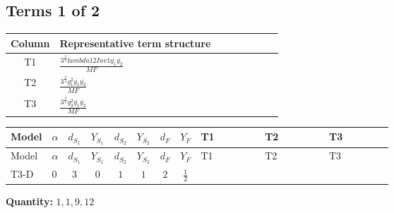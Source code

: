 \documentclass[8pt]{article}
\begin{document}
\begin{landscape}
\subsection*{Terms 1 of 2}
\begin{center}
\begin{tabular}{@{}c >{\raggedright\arraybackslash}p{0.82\linewidth}@{}}
\toprule
Column & Representative term structure \\
\midrule
T1 & \(\displaystyle \frac{3^{\frac{3}{4}} lambda12Inv1 \overline{y_{1}} \overline{y_{2}}}{MF}\) \\
\midrule
T2 & \(\displaystyle \frac{3^{\frac{3}{4}} g_{1}^{2} \overline{y_{1}} \overline{y_{2}}}{MF}\) \\
\midrule
T3 & \(\displaystyle \frac{3^{\frac{3}{4}} g_{2}^{2} \overline{y_{1}} \overline{y_{2}}}{MF}\) \\
\midrule
\bottomrule
\end{tabular}
\end{center}
\smallskip
\tiny
\begin{longtable}{@{}llcccccc >{\raggedright\arraybackslash}p{0.21\linewidth} >{\raggedright\arraybackslash}p{0.21\linewidth} >{\raggedright\arraybackslash}p{0.21\linewidth}@{}}
\toprule
Model & $\alpha$ & $d_{S_1}$ & $Y_{S_1}$ & $d_{S_2}$ & $Y_{S_2}$ & $d_F$ & $Y_F$ & T1 & T2 & T3 \\
\midrule
\endfirsthead
\toprule
Model & $\alpha$ & $d_{S_1}$ & $Y_{S_1}$ & $d_{S_2}$ & $Y_{S_2}$ & $d_F$ & $Y_F$ & T1 & T2 & T3 \\
\midrule
\endhead
T3-D & $0$ & $3$ & $0$ & $1$ & $1$ & $2$ & $\frac{1}{2}$ & \scriptsize\adjustbox{max width=\linewidth}{$\begin{gathered} \frac{3^{\frac{3}{4}} lambda12Inv1 \overline{y_{1}} \overline{y_{2}}}{6 MF}\end{gathered}$} & \scriptsize\adjustbox{max width=\linewidth}{$\begin{gathered} \frac{3^{\frac{3}{4}} g_{1}^{2} \overline{y_{1}} \overline{y_{2}}}{8 MF}\end{gathered}$} & \scriptsize\adjustbox{max width=\linewidth}{$\begin{gathered} \frac{11 \cdot 3^{\frac{3}{4}} g_{2}^{2} \overline{y_{1}} \overline{y_{2}}}{8 MF}\end{gathered}$} \\
\midrule
\bottomrule
\end{longtable}
\clearpage
\noindent\textbf{Quantity: }$\mathrm{1,1,9,12}$\par\smallskip

\end{landscape}
\end{document}
